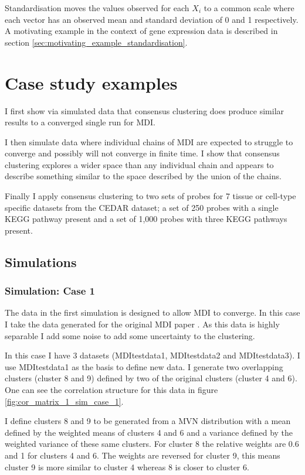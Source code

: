 \documentclass[12pt]{article} %
\begin{document}
	Standardisation moves the values observed for each $X_i$ to a common scale where each vector has an observed mean and standard deviation of 0 and 1 respectively. A motivating example in the context of gene expression data is described in section \ref{sec:motivating_example_standardisation}.

	\section{Case study examples}
	I first show via simulated data that consensus clustering does produce similar results to a converged single run for MDI.
	
	I then simulate data where individual chains of MDI are expected to struggle to converge and possibly will not converge in finite time. I show that consensus clustering explores a wider space than any individual chain and appears to describe something similar to the space described by the union of the chains.
	
	Finally I apply consensus clustering to two sets of probes for 7 tissue or cell-type specific datasets from the CEDAR dataset; a set of 250 probes with a single KEGG pathway present and a set of 1,000 probes with three KEGG pathways present.
	
	\subsection{Simulations}
	\subsubsection{Simulation: Case 1} \label{sec:sim:data:case_1}
	The data in the first simulation is designed to allow MDI to converge. In this case I take the data generated for the original MDI paper \citep{KirkBayesiancorrelatedclustering2012}. As this data is highly separable I add some noise to add some uncertainty to the clustering. 
	
	In this case I have 3 datasets (MDItestdata1, MDItestdata2 and MDItestdata3). I use MDItestdata1 as the basis to define new data. I generate two overlapping clusters (cluster 8 and 9) defined by two of the original clusters (cluster 4 and 6). One can see the correlation structure for this data in figure \ref{fig:cor_matrix_1_sim_case_1}.
	
	I define clusters 8 and 9 to be generated from a MVN distribution with a mean defined by the weighted means of clusters 4 and 6 and a variance defined by the weighted variance of these same clusters. For cluster 8 the relative weights are 0.6 and 1 for clusters 4 and 6. The weights are reversed for cluster 9, this means cluster 9 is more similar to cluster 4 whereas 8 is closer to cluster 6. 
	
\end{document}
